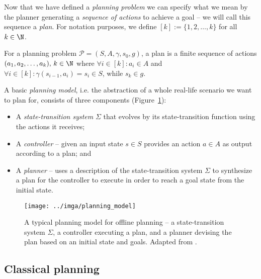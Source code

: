 Now that we have defined a \textit{planning problem} we can specify what we mean
by the planner generating a \textit{sequence of actions} to achieve a goal -- we will
call this sequence a \textit{plan}.
For notation purposes, we define $[k] := \{1, 2, \ldots, k\}$ for all $k \in \N$.

\begin{defn}[Plan]\label{defn:plan}\citep[Section~1.5]{Ghallab2004}
For a planning problem $\mathcal{P} = (S, A, \gamma, s_0, g)$,
a plan is a finite sequence of actions $(a_1, a_2, \ldots, a_k),\, k \in \N$ where
$\forall i \in [k] : a_i \in A$ and
$\forall i \in [k] : \gamma(s_{i-1}, a_i) = s_i \in S$, while $s_k \in g$.
\end{defn}

A basic \textit{planning model}, i.e. the abstraction of a whole real-life scenario
we want to plan for, consists of three components (Figure~\ref{fig:planning-model}):

\begin{itemize}
\item A \textit{state-transition system} $\Sigma$ that evolves by its state-transition function using the actions
it receives;
\item A \textit{controller} -- given an input state $s \in S$ provides an action $a \in A$ as output according
to a plan; and
\item A \textit{planner} -- uses a description of the state-transition system $\Sigma$ to synthesize a plan for the controller
to execute in order to reach a goal state from the initial state.
\end{itemize}

\begin{figure}[tb]
\begin{center}
\texttt{[image: ../imga/planning\_model]}
\end{center}
\caption[A typical planning model for offline planning.]{A typical planning model for offline planning -- a state-transition system $\Sigma$, a controller executing a plan, and a planner devising the plan based on an initial state and goals. Adapted from \citep[Figure~1.3]{Ghallab2004}.}
\label{fig:planning-model}
\end{figure}

\subsection{Classical planning}\label{classical-planning}

